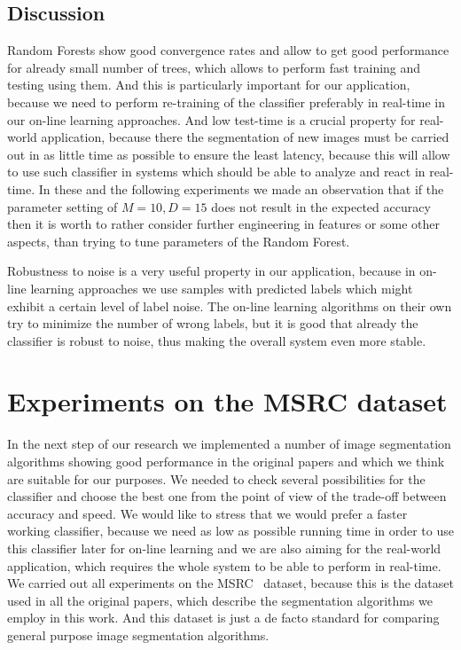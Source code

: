 \subsection{Discussion}
Random Forests show good convergence rates and allow to get good performance for already small number of trees, which allows to perform fast training
and testing using them. And this is particularly important for our application, because we need to perform re-training of the classifier preferably
in real-time in our on-line learning approaches. And low test-time is a crucial property for real-world application, because there the segmentation
of new images must be carried out in as little time as possible to ensure the least latency, because this will allow to use such classifier in
systems which should be able to analyze and react in real-time. In these and the following experiments we made an observation that
if the parameter setting of $M = 10, D = 15$ does not result in the expected accuracy then it is worth to rather consider further engineering
in features or some other aspects, than trying to tune parameters of the Random Forest.

Robustness to noise is a very useful property in our application, because in on-line learning approaches we use samples with predicted labels
which might exhibit a certain level of label noise. The on-line learning algorithms on their own try to minimize the number of wrong labels,
but it is good that already the classifier is robust to noise, thus making the overall system even more stable.

\section{Experiments on the MSRC dataset}
\label{msrc_experiments}

In the next step of our research we implemented a number of image segmentation algorithms showing good performance in the original papers and which
we think are suitable for our purposes. We needed to check several possibilities for the classifier and choose the best one from the point of view
of the trade-off between accuracy and speed. We would like to stress that we would prefer a faster working classifier, because we need as low as
possible running time in order to use this classifier later for on-line learning and we are also aiming for the real-world application, which
requires the whole system to be able to perform in real-time.
We carried out all experiments on the MSRC~\cite{MSRC} dataset, because this is the dataset used in all the original papers,
which describe the segmentation algorithms we employ in this work. And this dataset is just a de facto standard for comparing general
purpose image segmentation algorithms.

